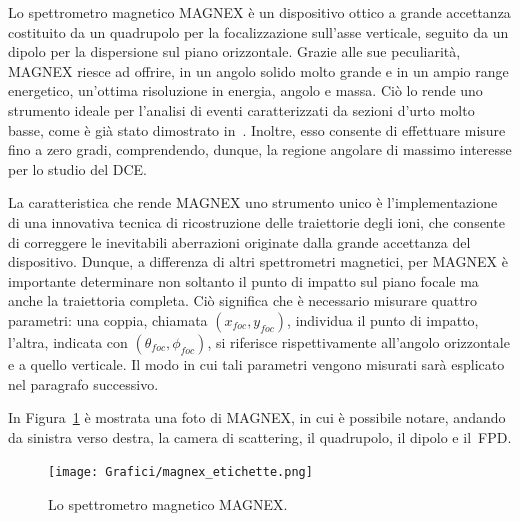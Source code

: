 Lo spettrometro magnetico MAGNEX è un dispositivo ottico a grande accettanza costituito da un quadrupolo per la focalizzazione sull'asse verticale, seguito da un dipolo per la dispersione sul piano orizzontale.
Grazie alle sue peculiarità,  MAGNEX riesce ad offrire, in un angolo solido molto grande e in un ampio range energetico, un'ottima risoluzione in energia, angolo e massa.
Ciò lo rende uno strumento ideale per l'analisi di eventi caratterizzati da sezioni d'urto molto basse, come è già stato dimostrato in~\cite{cappuzzello:epja16,pereira:plb12,oliveira:jpg13}.
Inoltre, esso consente di effettuare misure fino a zero gradi, comprendendo, dunque, la regione angolare di massimo interesse per lo studio del DCE.

La caratteristica che rende MAGNEX uno strumento unico è l'implementazione di una innovativa tecnica di ricostruzione delle traiettorie degli ioni, che consente di correggere le inevitabili aberrazioni originate dalla grande accettanza del dispositivo.
Dunque, a differenza di altri spettrometri magnetici, per MAGNEX è importante determinare non soltanto il punto di impatto sul piano focale ma anche la traiettoria completa. Ciò significa che è necessario misurare quattro parametri: una coppia, chiamata $(x_{foc}, y_{foc})$, individua il punto di impatto, l'altra, indicata con $(\theta_{foc}, \phi_{foc})$, si riferisce rispettivamente all'angolo orizzontale e a quello verticale.
Il modo in cui tali parametri vengono misurati sarà esplicato nel paragrafo successivo.

In Figura~\ref{fig:magnex} è mostrata una foto di MAGNEX, in cui è possibile notare, andando da sinistra verso destra, la camera di scattering, il quadrupolo, il dipolo e il~FPD.

\begin{figure} [!t]
	\centering
	\texttt{[image: Grafici/magnex\_etichette.png]}
	\caption{Lo spettrometro magnetico MAGNEX.} \label{fig:magnex}
\end{figure}




\subsection{} \label{sez:fpd}

